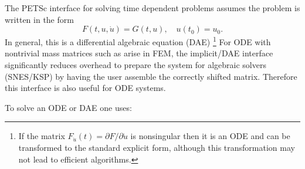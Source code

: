 \vspace{.2cm}

The PETSc interface for solving time dependent problems assumes the problem is written in the form
\[
        F(t,u,\dot{u}) = G(t,u), \quad u(t_0) = u_0.
\]
In general, this is a differential algebraic
equation (DAE) \footnote{If the matrix $F_{\dot{u}}(t) = \partial F
/ \partial \dot{u}$ is nonsingular then it is an ODE and can be
transformed to the standard explicit form, although this transformation
may not lead to efficient algorithms.} For ODE with nontrivial mass
matrices such as arise in FEM, the implicit/DAE interface significantly
reduces overhead to prepare the system for algebraic solvers (SNES/KSP)
by having the user assemble the correctly shifted matrix.  Therefore
this interface is also useful for ODE systems.

To solve an ODE or DAE one uses:

